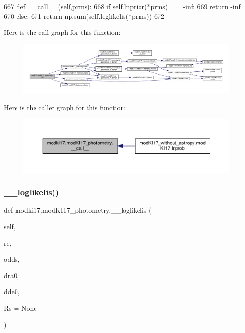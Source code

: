 \begin{DoxyCode}
667     \textcolor{keyword}{def }\_\_call\_\_(self,prms):
668         \textcolor{keywordflow}{if} self.lnprior(*prms) == -inf:
669             \textcolor{keywordflow}{return} -inf
670         \textcolor{keywordflow}{else}:
671             \textcolor{keywordflow}{return} np.sum(self.loglikelis(*prms))
672         
\end{DoxyCode}
Here is the call graph for this function\+:\nopagebreak
\begin{figure}[H]
\begin{center}
\leavevmode
\includegraphics[width=350pt]{dd/db2/classmodki17_1_1modKI17__photometry_a8161b90b7f4ae01225328c840512f1f5_cgraph}
\end{center}
\end{figure}
Here is the caller graph for this function\+:\nopagebreak
\begin{figure}[H]
\begin{center}
\leavevmode
\includegraphics[width=350pt]{dd/db2/classmodki17_1_1modKI17__photometry_a8161b90b7f4ae01225328c840512f1f5_icgraph}
\end{center}
\end{figure}
\mbox{\label{classmodki17_1_1modKI17__photometry_a8e4f0338eabca2c723b6cf4148dec7a7}} 
\subsubsection{\texorpdfstring{\+\_\+\+\_\+loglikelis()}{\_\_loglikelis()}}
{\footnotesize\ttfamily def modki17.\+mod\+K\+I17\+\_\+photometry.\+\_\+\+\_\+loglikelis (\begin{DoxyParamCaption}\item[{}]{self,  }\item[{}]{re,  }\item[{}]{odds,  }\item[{}]{dra0,  }\item[{}]{dde0,  }\item[{}]{Rs = {\ttfamily None} }\end{DoxyParamCaption})\hspace{0.3cm}{\ttfamily [private]}}



